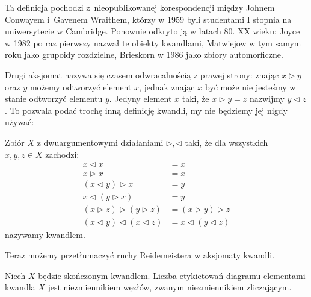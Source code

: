 Ta definicja pochodzi z~nieopublikowanej korespondencji między Johnem Conwayem i~Gavenem Wraithem, którzy w 1959 byli studentami I stopnia na uniwersytecie w Cambridge.
%
%
Ponownie odkryto ją w latach 80. XX wieku: Joyce w 1982 po raz pierwszy nazwał te obiekty kwandlami, Matwiejow w tym samym roku jako grupoidy rozdzielne, Brieskorn w 1986 jako zbiory automorficzne.
%
%
%
%
%

Drugi aksjomat nazywa się czasem odwracalnością z prawej strony: znając $x \triangleright y$ oraz $y$ możemy odtworzyć element $x$, jednak znając $x$ być może nie jesteśmy w stanie odtworzyć elementu $y$.
Jedyny element $x$ taki, że $x \triangleright y = z$ nazwijmy $y \triangleleft z$.
To pozwala podać trochę inną definicję kwandli, my nie będziemy jej nigdy używać:

\begin{definition}
    Zbiór $X$ z dwuargumentowymi działaniami $\triangleright, \triangleleft$ taki, że dla wszystkich $x, y, z \in X$ zachodzi:
    \begin{align}
    x \triangleleft x & = x \\
    x \triangleright x & = x \\
    (x \triangleleft y) \triangleright x & = y \\
    x \triangleleft (y \triangleright x) & = y \\
     (x \triangleright z) \triangleright (y \triangleright z) & = (x \triangleright y) \triangleright z \\
    (x \triangleleft y) \triangleleft (x \triangleleft z) & = x \triangleleft (y \triangleleft z)
    \end{align}
    nazywamy kwandlem.
\end{definition}

Teraz możemy przetłumaczyć ruchy Reidemeistera w aksjomaty kwandli.
%

\begin{proposition}
%
    Niech $X$ będzie skończonym kwandlem.
    Liczba etykietowań diagramu elementami kwandla $X$ jest niezmiennikiem węzłów, zwanym niezmiennikiem zliczającym.
\end{proposition}

